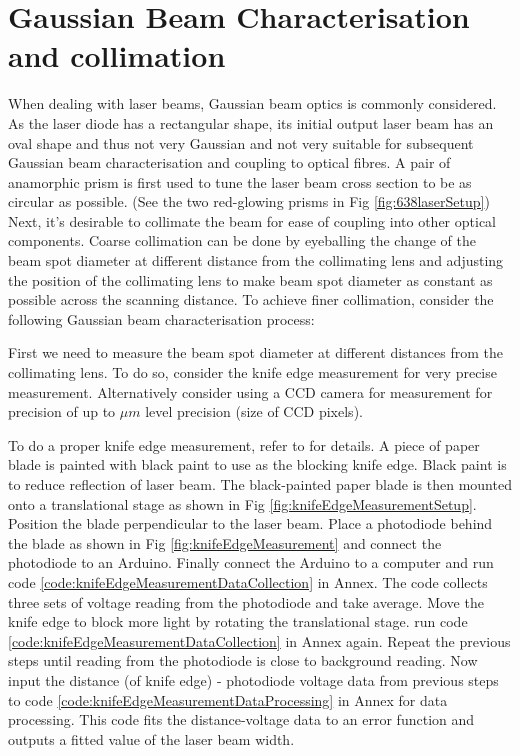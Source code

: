 \documentclass[12pt]{report}
\begin{document}
\section{Gaussian Beam Characterisation and collimation}
When dealing with laser beams, Gaussian beam optics is commonly considered. As the laser diode has a rectangular shape, its initial output laser beam has an oval shape and thus not very Gaussian and not very suitable for subsequent Gaussian beam characterisation and coupling to optical fibres. A pair of anamorphic prism is first used to tune the laser beam cross section to be as circular as possible. (See the two red-glowing prisms in Fig \ref{fig:638laserSetup}) Next, it's desirable to collimate the beam for ease of coupling into other optical components. Coarse collimation can be done by eyeballing the change of the beam spot diameter at different distance from the collimating lens and adjusting the position of the collimating lens to make beam spot diameter as constant as possible across the scanning distance. To achieve finer collimation, consider the following Gaussian beam characterisation process: 
\par
First we need to measure the beam spot diameter at different distances from the collimating lens. To do so, consider the knife edge measurement for very precise measurement. Alternatively consider using a CCD camera for measurement for precision of up to $\mu m$ level precision (size of CCD pixels). 
\par
To do a proper knife edge measurement, refer to \cite{KnifeEdgeMeasurement} for details. A piece of paper blade is painted with black paint to use as the blocking knife edge. Black paint is to reduce reflection of laser beam. The black-painted paper blade is then mounted onto a translational stage as shown in Fig \ref{fig:knifeEdgeMeasurementSetup}. Position the blade perpendicular to the laser beam. Place a photodiode behind the blade as shown in Fig \ref{fig:knifeEdgeMeasurement} and connect the photodiode to an Arduino. Finally connect the Arduino to a computer and run code \ref{code:knifeEdgeMeasurementDataCollection} in Annex. The code collects three sets of voltage reading from the photodiode and take average. Move the knife edge to block more light by rotating the translational stage. run code \ref{code:knifeEdgeMeasurementDataCollection} in Annex again. Repeat the previous steps until reading from the photodiode is close to background reading. Now input the distance (of knife edge) - photodiode voltage data from previous steps to code \ref{code:knifeEdgeMeasurementDataProcessing} in Annex for data processing. This code fits the distance-voltage data to an error function and outputs a fitted value of the laser beam width. 
\end{document}
